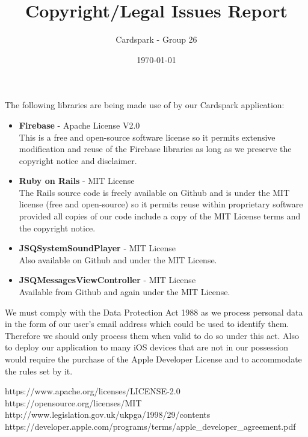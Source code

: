 \documentclass[a4wide, 10pt]{article}
\begin{document}
\title{Copyright/Legal Issues Report}

\author{Cardspark - Group 26}

\date{\today}         %

\maketitle            %

The following libraries are being made use of by our Cardspark application:
\begin{itemize}
	\item \textbf{Firebase} - Apache License V2.0 \cite{Apache License V2.0}\\
	This is a free and open-source software license so it permits extensive 		modification and reuse of the Firebase libraries as long as we preserve 		the 	copyright notice and disclaimer.
	
	\item \textbf{Ruby on Rails} - MIT License \cite{MIT License}\\
	The Rails source code is freely available on Github and is under the MIT 		license (free and open-source) so it permits reuse within proprietary 		software provided all copies of our code include a copy of the MIT 			License terms and the copyright notice.
	
	\item \textbf{JSQSystemSoundPlayer} - MIT License\\
	Also available on Github and under the MIT License.
	
	\item \textbf{JSQMessagesViewController} - MIT License\\
	Available from Github and again under the MIT License.

\end{itemize}

\vspace{0.8cm}

We must comply with the Data Protection Act 1988 \cite{Data Protection Act} as we process personal data in the form of our user's email address which could be used to identify them.  Therefore we should only process them when valid to do so under this act.  Also to deploy our application to many iOS devices that are not in our possession would require the purchase of the Apple Developer License \cite{Apple Developer Agreement} and to accommodate the rules set by it.

\begin{thebibliography}{1}
		https://www.apache.org/licenses/LICENSE-2.0
		https://opensource.org/licenses/MIT
		http://www.legislation.gov.uk/ukpga/1998/29/contents
		https://developer.apple.com/programs/terms/apple\_developer\_agreement.pdf
\end{thebibliography}
\end{document}
